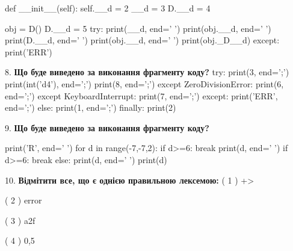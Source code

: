 \documentclass[11pt]{article}
\begin{document}
    def __init__(self):
        self.__d = 2
        __d = 3
        D.__d = 4

obj = D()
D.__d = 5
try:
    print(__d, end=' ')
    print(obj.__d, end=' ')
    print(D.__d, end=' ')
    print(obj.__d, end=' ')
    print(obj._D__d)
except:
    print('ERR')
\par\vspace{5mm}

8. \textbf{Що буде виведено за виконання фрагменту коду?}
try:
    print(3, end=';')
    print(int('d4'), end=';')
    print(8, end=';')
except ZeroDivisionError:
    print(6, end=';')
except KeyboardInterrupt:
    print(7, end=';')
except:
    print('ERR', end=';')
else:
    print(1, end=';')
finally:
    print(2)
\par\vspace{5mm}

9. \textbf{Що буде виведено за виконання фрагменту коду?}

print('R', end=' ')
for d in range(-7,-7,2):
    if d>=6:
        break
        print(d, end=' ')
    if d>=6:
        break
    else:
        print(d, end=' ')
    print(d)
\par\vspace{5mm}

10. %
\textbf{Відмітити все, що є однією правильною лексемою:}
( 1 ) +>

( 2 ) error

( 3 ) a2f

( 4 ) 0,5
\par\vspace{5mm}

\newpage
\end{document}
